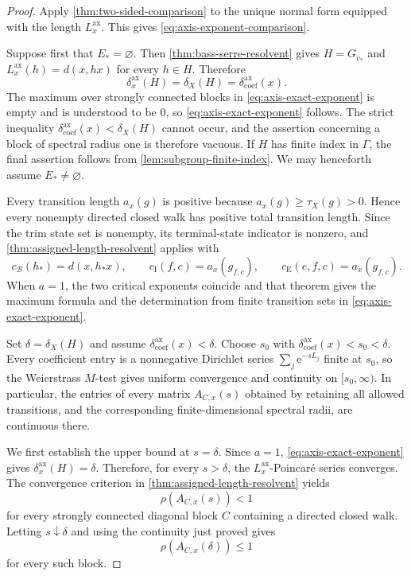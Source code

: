 \documentclass[11pt]{article}
\theoremstyle{definition}
\newcommand{\coef}{\mathrm{coef}}
\newcommand{\ax}{\mathrm{ax}}
\newcommand{\e}{\mathrm e}
\begin{document}
\begin{proof}
Apply \cref{thm:two-sided-comparison} to the unique normal form equipped with the length
$L^{\ax}_x$.  This gives \eqref{eq:axis-exponent-comparison}.

Suppose first that $E_*=\varnothing$.  Then \cref{thm:bass-serre-resolvent} gives
$H=G_{v_*}$ and $L^{\ax}_x(h)=d(x,hx)$ for every $h\in H$.  Therefore
\[
 \delta_x^{\ax}(H)=\delta_X(H)=\delta^{\ax}_{\coef}(x).
\]
The maximum over strongly connected blocks in \eqref{eq:axis-exact-exponent} is empty and is
understood to be $0$, so \eqref{eq:axis-exact-exponent} follows.  The strict inequality
$\delta^{\ax}_{\coef}(x)<\delta_X(H)$ cannot occur, and the assertion concerning a block of
spectral radius one is therefore vacuous.  If $H$ has finite index in $\Gamma$, the final
assertion follows from \cref{lem:subgroup-finite-index}.  We may henceforth assume
$E_*\ne\varnothing$.

Every transition length $a_x(g)$ is positive because $a_x(g)\ge\tau_X(g)>0$.  Hence every
nonempty directed closed walk has positive total transition length.  Since the trim state set
is nonempty, its terminal-state indicator is nonzero, and
\cref{thm:assigned-length-resolvent} applies with
\[
 c_{\mathcal B}(h_*)=d(x,h_*x),\qquad
 c_{\mathrm I}(f,c)=a_x(g_{f,c}),\qquad
 c_{\mathrm E}(e,f,c)=a_x(g_{f,c}).
\]
When $a=1$, the two critical exponents coincide and that theorem gives the maximum formula
and the determination from finite transition sets in \eqref{eq:axis-exact-exponent}.

Set $\delta=\delta_X(H)$ and assume
$\delta^{\ax}_{\coef}(x)<\delta$.  Choose
$s_0$ with $\delta^{\ax}_{\coef}(x)<s_0<\delta$.  Every coefficient entry is a
nonnegative Dirichlet series $\sum_j\e^{-sL_j}$ finite at $s_0$, so the Weierstrass
$M$-test gives uniform convergence and continuity on $[s_0,\infty)$.  In particular, the
entries of every matrix $A_{C,x}(s)$ obtained by retaining all allowed transitions, and the
corresponding finite-dimensional spectral radii, are continuous there.

We first establish the upper bound at $s=\delta$.  Since $a=1$,
\eqref{eq:axis-exact-exponent} gives $\delta_x^{\ax}(H)=\delta$.  Therefore, for every
$s>\delta$, the $L_x^{\ax}$-Poincar\'e series converges.  The convergence criterion in
\cref{thm:assigned-length-resolvent} yields
\[
 \rho(A_{C,x}(s))<1
\]
for every strongly connected diagonal block $C$ containing a directed closed walk.  Letting
$s\downarrow\delta$ and using the continuity just proved gives
\begin{equation}\label{eq:axis-critical-upper}
 \rho(A_{C,x}(\delta))\le1
\end{equation}
for every such block.


\end{proof}
\end{document}
